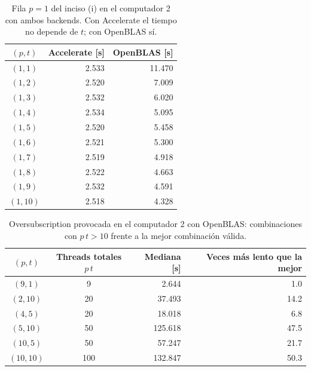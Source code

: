 \begin{table}[H]
    \centering
    \small
    \begin{tabular}{|c|r|r|}
    \hline
    \textbf{$(p,t)$} & \textbf{Accelerate [s]} & \textbf{OpenBLAS [s]} \\
    \hline
    $(1,1)$ & 2.533 & 11.470 \\
    $(1,2)$ & 2.520 & 7.009 \\
    $(1,3)$ & 2.532 & 6.020 \\
    $(1,4)$ & 2.534 & 5.095 \\
    $(1,5)$ & 2.520 & 5.458 \\
    $(1,6)$ & 2.521 & 5.300 \\
    $(1,7)$ & 2.519 & 4.918 \\
    $(1,8)$ & 2.522 & 4.663 \\
    $(1,9)$ & 2.532 & 4.591 \\
    $(1,10)$ & 2.518 & 4.328 \\
    \hline
    \end{tabular}
    \caption{Fila $p=1$ del inciso (i) en el computador 2 con ambos backends. Con Accelerate el tiempo no depende de $t$; con OpenBLAS sí.}
    \label{tab:anexo-i-p1}
\end{table}

\begin{table}[H]
    \centering
    \small
    \begin{tabular}{|c|c|r|r|}
    \hline
    \textbf{$(p,t)$} & \textbf{Threads totales $p\,t$} & \textbf{Mediana [s]} & \textbf{Veces más lento que la mejor} \\
    \hline
    $(9,1)$ & 9 & 2.644 & 1.0 \\
    $(2,10)$ & 20 & 37.493 & 14.2 \\
    $(4,5)$ & 20 & 18.018 & 6.8 \\
    $(5,10)$ & 50 & 125.618 & 47.5 \\
    $(10,5)$ & 50 & 57.247 & 21.7 \\
    $(10,10)$ & 100 & 132.847 & 50.3 \\
    \hline
    \end{tabular}
    \caption{Oversubscription provocada en el computador 2 con OpenBLAS: combinaciones con $p\,t>10$ frente a la mejor combinación válida.}
    \label{tab:anexo-oversub}
\end{table}
